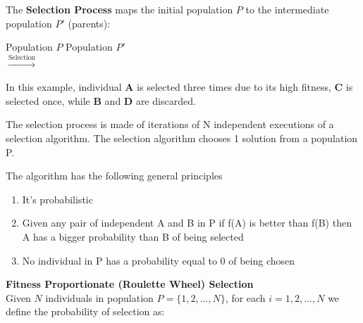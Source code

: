 \noindent
The \textbf{Selection Process} maps the initial population $P$ to the intermediate population $P'$ (parents):

\vspace{10pt}

\begin{center}
    Population $P$ \hspace{2cm} Population $P'$ \\
    \vspace{5pt}
    \hspace{1.5cm} $\xrightarrow{\text{Selection}}$ \hspace{1.5cm}
\end{center}

\vspace{10pt}

\noindent
In this example, individual \textbf{A} is selected three times due to its high fitness, \textbf{C} is selected once, while \textbf{B} and \textbf{D} are discarded.

\vspace{10pt}

The selection process is made of iterations of N independent executions of a selection algorithm. The selection algorithm chooses 1 solution from a population P.

The algorithm has the following general principles

\begin{enumerate}
    \item It's probabilistic
    \item Given any pair of independent A and B in P if f(A) is better than f(B) then A has a bigger probability than B of being selected
    \item No individual in P has a probability equal to 0 of being chosen
\end{enumerate}

\noindent
\textbf{Fitness Proportionate (Roulette Wheel) Selection} \\
Given $N$ individuals in population $P = \{1, 2, \dots, N\}$, for each $i = 1, 2, \dots, N$ we define the probability of selection as:

